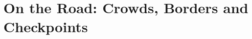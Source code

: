 \documentclass[11pt,a4paper,twoside,openright]{book}
\begin{document}
\part{On the Road: Crowds, Borders and Checkpoints}
%


%
%
%
%
%
%
%
%
%
%
%
%
%
%
%
%
%
%
%
%
\appendix
%
%
%
%
%

\backmatter
\cleardoublepage{}


\end{document}

